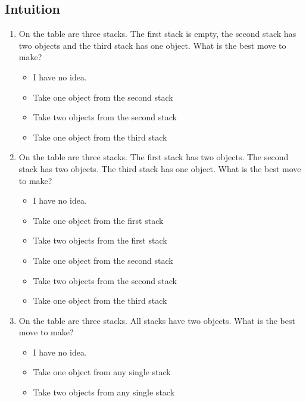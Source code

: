 \subsection{Intuition}
\begin{framed}
\begin{enumerate}
	\item On the table are three stacks. The first stack is empty, the second
		stack has two objects and the third stack has one object. What is the
		best move to make?
		\begin{itemize}
			\item I have no idea.
			\item Take one object from the second stack
			\item Take two objects from the second stack
			\item Take one object from the third stack
		\end{itemize}
	\item On the table are three stacks. The first stack has two objects. The
		second stack has two objects. The third stack has one object. What is
		the best move to make?
		\begin{itemize}
			\item I have no idea.
			\item Take one object from the first stack
			\item Take two objects from the first stack
			\item Take one object from the second stack
			\item Take two objects from the second stack
			\item Take one object from the third stack
		\end{itemize}
	\item On the table are three stacks. All stacks have two objects. What is
		the best move to make?
		\begin{itemize}
			\item I have no idea.
			\item Take one object from any single stack
			\item Take two objects from any single stack
		\end{itemize}
\end{enumerate}
\end{framed}
